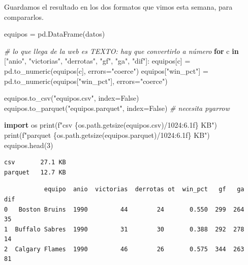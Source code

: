 \documentclass[
]{article}
\newenvironment{Shaded}{}{}
\newcommand{\BuiltInTok}[1]{\textcolor[rgb]{0.00,0.50,0.00}{#1}}
\newcommand{\CommentTok}[1]{\textcolor[rgb]{0.38,0.63,0.69}{\textit{#1}}}
\newcommand{\ControlFlowTok}[1]{\textcolor[rgb]{0.00,0.44,0.13}{\textbf{#1}}}
\newcommand{\DecValTok}[1]{\textcolor[rgb]{0.25,0.63,0.44}{#1}}
\newcommand{\ImportTok}[1]{\textcolor[rgb]{0.00,0.50,0.00}{\textbf{#1}}}
\newcommand{\KeywordTok}[1]{\textcolor[rgb]{0.00,0.44,0.13}{\textbf{#1}}}
\newcommand{\NormalTok}[1]{#1}
\newcommand{\OperatorTok}[1]{\textcolor[rgb]{0.40,0.40,0.40}{#1}}
\newcommand{\SpecialCharTok}[1]{\textcolor[rgb]{0.25,0.44,0.63}{#1}}
\newcommand{\SpecialStringTok}[1]{\textcolor[rgb]{0.73,0.40,0.53}{#1}}
\newcommand{\StringTok}[1]{\textcolor[rgb]{0.25,0.44,0.63}{#1}}
\newcommand{\VariableTok}[1]{\textcolor[rgb]{0.10,0.09,0.49}{#1}}
\begin{document}
Guardamos el resultado en los dos formatos que vimos esta semana, para
compararlos.

\protect{}\label{GcmKL8mNnYyL}
\begin{Shaded}
\begin{Highlighting}[]
\NormalTok{equipos }\OperatorTok{=}\NormalTok{ pd.DataFrame(datos)}

\CommentTok{\# lo que llega de la web es TEXTO: hay que convertirlo a número}
\ControlFlowTok{for}\NormalTok{ c }\KeywordTok{in}\NormalTok{ [}\StringTok{"anio"}\NormalTok{, }\StringTok{"victorias"}\NormalTok{, }\StringTok{"derrotas"}\NormalTok{, }\StringTok{"gf"}\NormalTok{, }\StringTok{"ga"}\NormalTok{, }\StringTok{"dif"}\NormalTok{]:}
\NormalTok{    equipos[c] }\OperatorTok{=}\NormalTok{ pd.to\_numeric(equipos[c], errors}\OperatorTok{=}\StringTok{"coerce"}\NormalTok{)}
\NormalTok{equipos[}\StringTok{"win\_pct"}\NormalTok{] }\OperatorTok{=}\NormalTok{ pd.to\_numeric(equipos[}\StringTok{"win\_pct"}\NormalTok{], errors}\OperatorTok{=}\StringTok{"coerce"}\NormalTok{)}

\NormalTok{equipos.to\_csv(}\StringTok{"equipos.csv"}\NormalTok{, index}\OperatorTok{=}\VariableTok{False}\NormalTok{)}
\NormalTok{equipos.to\_parquet(}\StringTok{"equipos.parquet"}\NormalTok{, index}\OperatorTok{=}\VariableTok{False}\NormalTok{)   }\CommentTok{\# necesita pyarrow}

\ImportTok{import}\NormalTok{ os}
\BuiltInTok{print}\NormalTok{(}\SpecialStringTok{f"csv     }\SpecialCharTok{\{}\NormalTok{os}\SpecialCharTok{.}\NormalTok{path}\SpecialCharTok{.}\NormalTok{getsize(}\StringTok{\textquotesingle{}equipos.csv\textquotesingle{}}\NormalTok{)}\OperatorTok{/}\DecValTok{1024}\SpecialCharTok{:6.1f\}}\SpecialStringTok{ KB"}\NormalTok{)}
\BuiltInTok{print}\NormalTok{(}\SpecialStringTok{f"parquet }\SpecialCharTok{\{}\NormalTok{os}\SpecialCharTok{.}\NormalTok{path}\SpecialCharTok{.}\NormalTok{getsize(}\StringTok{\textquotesingle{}equipos.parquet\textquotesingle{}}\NormalTok{)}\OperatorTok{/}\DecValTok{1024}\SpecialCharTok{:6.1f\}}\SpecialStringTok{ KB"}\NormalTok{)}
\NormalTok{equipos.head(}\DecValTok{3}\NormalTok{)}
\end{Highlighting}
\end{Shaded}

\begin{verbatim}
csv       27.1 KB
parquet   12.7 KB
\end{verbatim}

\begin{verbatim}
           equipo  anio  victorias  derrotas ot  win_pct   gf   ga  dif
0   Boston Bruins  1990         44        24       0.550  299  264   35
1  Buffalo Sabres  1990         31        30       0.388  292  278   14
2  Calgary Flames  1990         46        26       0.575  344  263   81
\end{verbatim}
\end{document}

